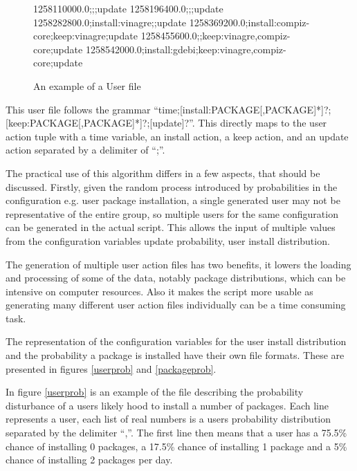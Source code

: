 \begin{figure}[htp]
\begin{center}
1258110000.0;;;update
1258196400.0;;;update
1258282800.0;install:vinagre;;update
1258369200.0;install:compiz-core;keep:vinagre;update
1258455600.0;;keep:vinagre,compiz-core;update
1258542000.0;install:gdebi;keep:vinagre,compiz-core;update
  \caption[User File example]{An example of a User file}
  \label{userfile}
\end{center}
\end{figure}

This user file follows the grammar ``time;[install:PACKAGE[,PACKAGE]*]?;[keep:PACKAGE[,PACKAGE]*]?;[update]?''.
This directly maps to the user action tuple with a time variable, an install action, a keep action, and an update action separated by a delimiter of ``;''.

The practical use of this algorithm differs in a few aspects, that should be discussed.
Firstly, given the random process introduced by probabilities in the configuration e.g. user package installation,
a single generated user may not be representative of the entire group, so multiple users for the same configuration can be generated in the actual script.
This allows the input of multiple values from the configuration variables update probability, user install distribution.

The generation of multiple user action files has two benefits, it lowers the loading and processing of some of the data, notably package distributions, which can be intensive on computer resources.
Also it makes the script more usable as generating many different user action files individually can be a time consuming task.

The representation of the configuration variables for the user install distribution and the probability a package is installed have their own file formats.
These are presented in figures \ref{userprob} and \ref{packageprob}.

In figure \ref{userprob} is an example of the file describing the probability disturbance of a users likely hood to install a number of packages.
Each line represents a user, each list of real numbers is a users probability distribution separated by the delimiter ``,''.
The first line then means that a user has a 75.5\% chance of installing 0 packages, a 17.5\% chance of installing 1 package and a 5\% chance of installing 2 packages per day.

